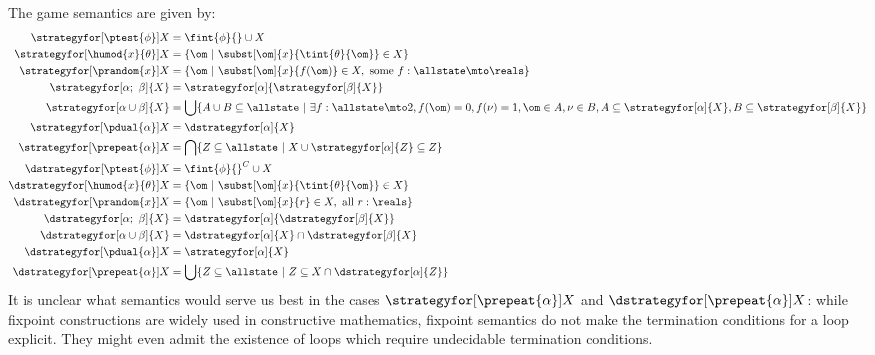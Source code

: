 The game semantics are given by:
\begin{align*}
  \strategyfor[\ptest{\phi}]{X}      &= \fint{\phi}{} \cup X\\
  \strategyfor[\humod{x}{\theta}]{X} &= \{\om~|~\subst[\om]{x}{\tint{\theta}{\om}} \in X\}\\
  \strategyfor[\prandom{x}]{X}       &= \{\om~|~\subst[\om]{x}{f(\om)} \in X, \text{ some }f:\allstate\mto\reals\}\\
  \strategyfor[\alpha;~\beta]{X}     &= \strategyfor[\alpha]{\strategyfor[\beta]{X}}\\
  \strategyfor[\alpha\cup\beta]{X}   &= \bigcup\{A \cup B \subseteq \allstate~|~\exists f:\allstate\mto 2, f(\om)=0,f(\nu)=1,\om\in A, \nu \in B, A \subseteq\strategyfor[\alpha]{X}, B \subseteq\strategyfor[\beta]{X}\}\\
  \strategyfor[\pdual{\alpha}]{X}    &= \dstrategyfor[\alpha]{X}\\
  \strategyfor[\prepeat{\alpha}]{X}  &= \bigcap\{Z\subseteq\allstate~|~X\cup\strategyfor[\alpha]{Z} \subseteq Z\}\\
  \dstrategyfor[\ptest{\phi}]{X}      &= \fint{\phi}{}^C \cup X\\
  \dstrategyfor[\humod{x}{\theta}]{X} &= \{\om~|~\subst[\om]{x}{\tint{\theta}{\om}} \in X\}\\
  \dstrategyfor[\prandom{x}]{X}       &= \{\om~|~\subst[\om]{x}{r} \in X, \text{ all }r:\reals\}\\
  \dstrategyfor[\alpha;~\beta]{X}     &= \dstrategyfor[\alpha]{\dstrategyfor[\beta]{X}}\\
  \dstrategyfor[\alpha\cup\beta]{X}   &= \dstrategyfor[\alpha]{X} \cap \dstrategyfor[\beta]{X}\\
  \dstrategyfor[\pdual{\alpha}]{X}    &= \strategyfor[\alpha]{X}\\
  \dstrategyfor[\prepeat{\alpha}]{X}  &= \bigcup\{Z\subseteq\allstate~|~Z\subseteq X\cap \dstrategyfor[\alpha]{Z}\}
\end{align*}
It is unclear what semantics would serve us best in the cases $\strategyfor[\prepeat{\alpha}]{X}$ and $\dstrategyfor[\prepeat{\alpha}]{X}$: while fixpoint constructions are widely used in constructive mathematics, fixpoint semantics do not make the termination conditions for a loop explicit.
They might even admit the existence of loops which require undecidable termination conditions.

